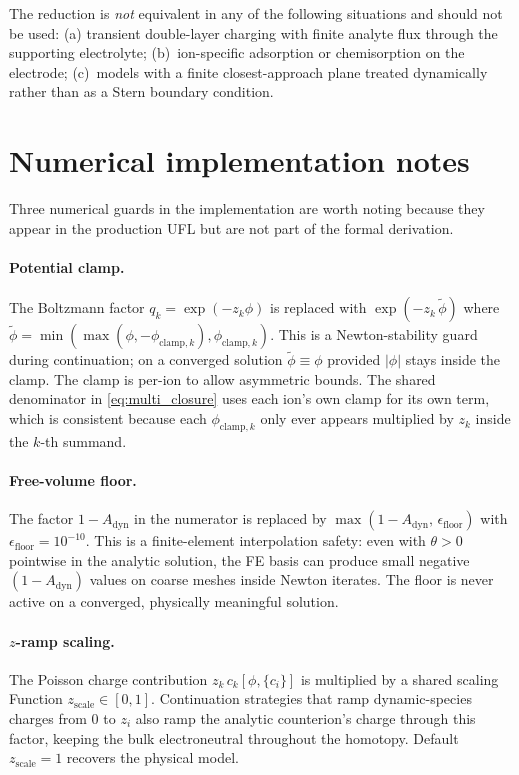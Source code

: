 \documentclass[11pt]{article}
\begin{document}
The reduction is \emph{not} equivalent in any of the following
situations and should not be used: (a) transient double-layer charging
with finite analyte flux through the supporting electrolyte;
(b)~ion-specific adsorption or chemisorption on the electrode;
(c)~models with a finite closest-approach plane treated dynamically
rather than as a Stern boundary condition.

\section{Numerical implementation notes}

Three numerical guards in the implementation are worth noting because
they appear in the production UFL but are not part of the formal
derivation.

\paragraph{Potential clamp.} The Boltzmann factor $q_k = \exp(-z_k\phi)$
is replaced with $\exp(-z_k\,\widetilde\phi)$ where
$\widetilde\phi = \min(\max(\phi,-\phi_{\mathrm{clamp},k}),
\phi_{\mathrm{clamp},k})$. This is a Newton-stability guard during
continuation; on a converged solution $\widetilde\phi \equiv \phi$
provided $|\phi|$ stays inside the clamp. The clamp is per-ion to allow
asymmetric bounds. The shared denominator
in \eqref{eq:multi_closure} uses each ion's own clamp for its own term,
which is consistent because each $\phi_{\mathrm{clamp},k}$ only ever
appears multiplied by $z_k$ inside the $k$-th summand.

\paragraph{Free-volume floor.} The factor $1-A_{\mathrm{dyn}}$ in the
numerator is replaced by $\max(1-A_{\mathrm{dyn}},\,\epsilon_{\mathrm{floor}})$
with $\epsilon_{\mathrm{floor}} = 10^{-10}$. This is a finite-element
interpolation safety: even with $\theta > 0$ pointwise in the analytic
solution, the FE basis can produce small negative $(1-A_{\mathrm{dyn}})$
values on coarse meshes inside Newton iterates. The floor is never
active on a converged, physically meaningful solution.

\paragraph{$z$-ramp scaling.} The Poisson charge contribution
$z_k\,c_k[\phi,\{c_i\}]$ is multiplied by a shared scaling Function
$z_{\mathrm{scale}} \in [0,1]$. Continuation strategies that ramp
dynamic-species charges from $0$ to $z_i$ also ramp the analytic
counterion's charge through this factor, keeping the bulk
electroneutral throughout the homotopy. Default $z_{\mathrm{scale}} = 1$
recovers the physical model.
\end{document}
